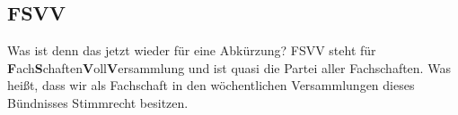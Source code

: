 

\subsection{FSVV}
Was ist denn das jetzt wieder für eine Abkürzung? FSVV steht
für \textbf{F}ach\textbf{S}chaften\textbf{V}oll\textbf{V}ersammlung und ist
quasi die Partei aller Fachschaften. Was heißt, dass wir als Fachschaft in den
wöchentlichen Versammlungen dieses Bündnisses Stimmrecht besitzen.

